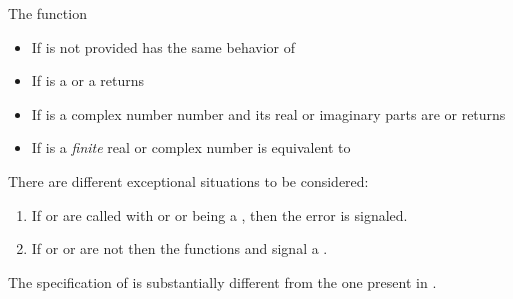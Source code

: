 \documentclass[../Comparisons-Predicates.tex]{subfiles}
\begin{document}
    The function 
    \begin{itemize}
        \item If  is not provided has the same behavior of
        \item If  is a  or a
         returns
         
        \item If  is a complex number number and its real or
        imaginary parts are  or
         returns
         
        \item If  is a \emph{finite} real or complex number is
        equivalent to  
        \code{)}
    \end{itemize}

    \DExceptional{}

    There are different exceptional situations to be considered:
    \begin{enumerate}
        \item If  or  are called with
         or  or  being a
        , then the
         error is signaled.
        \item If  or  or  are not \CL{}
         then the functions  and 
        signal a .
    \end{enumerate}

%


    \DNotes{}

    The specification of  is substantially different from the
    one present in \cite{1994:ANSICL}.
\end{document}
